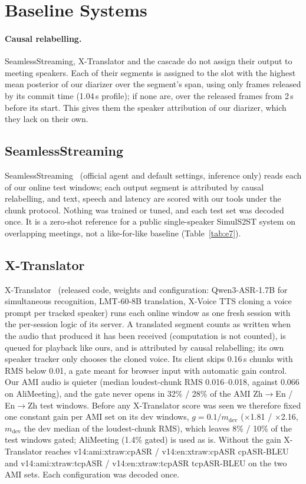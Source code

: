 \section{Baseline Systems}
\label{app:baselines}

\paragraph{Causal relabelling.} SeamlessStreaming, X-Translator and the cascade do not assign their output to meeting
speakers. Each of their segments is assigned to the slot with the highest mean posterior of our diarizer over the
segment's span, using only frames released by its commit time (1.04\,s profile); if none are, over the released frames
from 2\,s before its start. This gives them the speaker attribution of our diarizer, which they lack on their own.

\subsection{SeamlessStreaming}
\label{app:e7}
SeamlessStreaming~\citep{seamless2023} (official agent and default settings, inference only) reads each of our online
test windows; each output segment is attributed by causal relabelling, and text, speech and latency are scored with our
tools under the chunk protocol. Nothing was trained or tuned, and each test set was decoded once. It is a zero-shot
reference for a public single-speaker SimulS2ST system on overlapping meetings, not a like-for-like baseline
(Table~\ref{tab:e7}).


\ifXT
\subsection{X-Translator}
\label{app:xt}
X-Translator~\citep{zhao2026xtranslator} (released code, weights and configuration: Qwen3-ASR-1.7B for simultaneous
recognition, LMT-60-8B translation, X-Voice TTS cloning a voice prompt per tracked speaker) runs each online window as
one fresh session with the per-session logic of its server. A translated segment counts as written when the audio that
produced it has been received (computation is not counted), is queued for playback like ours, and is attributed by
causal relabelling; its own speaker tracker only chooses the cloned voice. Its client skips 0.16\,s chunks with RMS
below 0.01, a gate meant for browser input with automatic gain control. Our AMI audio is quieter (median loudest-chunk
RMS 0.016--0.018, against 0.066 on AliMeeting), and the gate never opens in 32\% / 28\% of the AMI Zh$\rightarrow$En /
En$\rightarrow$Zh test windows. Before any X-Translator score was seen we therefore fixed one constant gain per AMI set
on its dev windows, $g=0.1/m_\text{dev}$ ($\times$1.81 / $\times$2.16, $m_\text{dev}$ the dev median of the
loudest-chunk RMS), which leaves 8\% / 10\% of the test windows gated; AliMeeting (1.4\% gated) is used as is. Without
the gain X-Translator reaches \num{v14:ami:xtraw:cpASR} / \num{v14:en:xtraw:cpASR} cpASR-BLEU and
\num{v14:ami:xtraw:tcpASR} / \num{v14:en:xtraw:tcpASR} tcpASR-BLEU on the two AMI sets. Each configuration was decoded
once.
\fi

